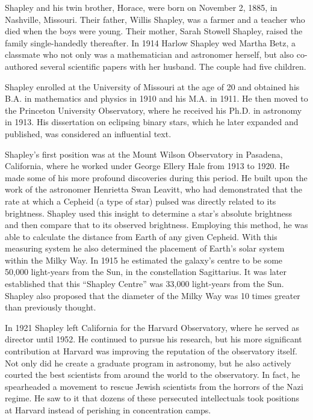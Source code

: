 Shapley and his twin brother, Horace, were born on November 2, 1885, in Nashville, Missouri. Their father, Willis Shapley, was a farmer and a teacher who died when the boys were young. Their mother, Sarah Stowell Shapley, raised the family single-handedly thereafter. In 1914 Harlow Shapley wed Martha Betz, a classmate who not only was a mathematician and astronomer herself, but also co-authored several scientific papers with her husband. The couple had five children.

Shapley enrolled at the University of Missouri at the age of 20 and obtained his B.A. in mathematics and physics in 1910 and his M.A. in 1911. He then moved to the Princeton University Observatory, where he received his Ph.D. in astronomy in 1913. His dissertation on eclipsing binary stars, which he later expanded and published, was considered an influential text.

Shapley's first position was at the Mount Wilson Observatory in Pasadena, California, where he worked under George Ellery Hale from 1913 to 1920. He made some of his more profound discoveries during this period. He built upon the work of the astronomer Henrietta Swan Leavitt, who had demonstrated that the rate at which a Cepheid (a type of star) pulsed was directly related to its brightness. Shapley used this insight to determine a star's absolute brightness and then compare that to its observed brightness. Employing this method, he was able to calculate the distance from Earth of any given Cepheid. With this measuring system he also determined the placement of Earth's solar system within the Milky Way. In 1915 he estimated the galaxy's centre to be some 50,000 light-years from the Sun, in the constellation Sagittarius. It was later established that this “Shapley Centre” was 33,000 light-years from the Sun. Shapley also proposed that the diameter of the Milky Way was 10 times greater than previously thought.

In 1921 Shapley left California for the Harvard Observatory, where he served as director until 1952. He continued to pursue his research, but his more significant contribution at Harvard was improving the reputation of the observatory itself. Not only did he create a graduate program in astronomy, but he also actively courted the best scientists from around the world to the observatory. In fact, he spearheaded a movement to rescue Jewish scientists from the horrors of the Nazi regime. He saw to it that dozens of these persecuted intellectuals took positions at Harvard instead of perishing in concentration camps.

